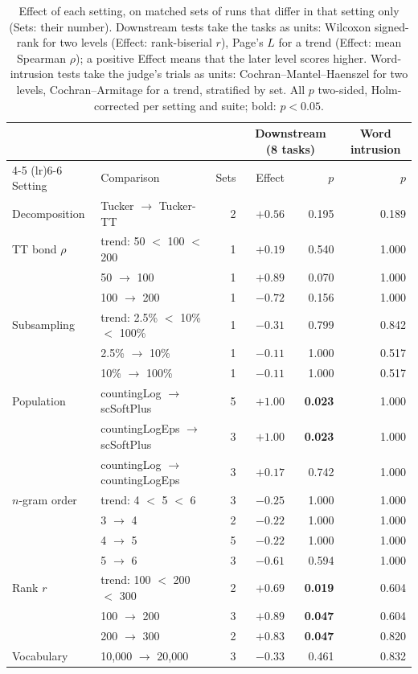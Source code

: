 \begin{table}[t]
  \centering
  \small
  \begin{tabular}{llrrrr}
    \toprule
     &  &  & \multicolumn{2}{c}{Downstream (8 tasks)} & \multicolumn{1}{c}{Word intrusion} \\
    \cmidrule(lr){4-5} \cmidrule(lr){6-6}
    Setting & Comparison & Sets & Effect & $p$ & $p$ \\
    \midrule
    Decomposition & Tucker $\rightarrow$ Tucker-TT & 2 & $+0.56$ & 0.195 & 0.189 \\
    \midrule
    TT bond $\rho$ & trend: 50 $<$ 100 $<$ 200 & 1 & $+0.19$ & 0.540 & 1.000 \\
     & 50 $\rightarrow$ 100 & 1 & $+0.89$ & 0.070 & 1.000 \\
     & 100 $\rightarrow$ 200 & 1 & $-0.72$ & 0.156 & 1.000 \\
    \midrule
    Subsampling & trend: 2.5\% $<$ 10\% $<$ 100\% & 1 & $-0.31$ & 0.799 & 0.842 \\
     & 2.5\% $\rightarrow$ 10\% & 1 & $-0.11$ & 1.000 & 0.517 \\
     & 10\% $\rightarrow$ 100\% & 1 & $-0.11$ & 1.000 & 0.517 \\
    \midrule
    Population & countingLog $\rightarrow$ scSoftPlus & 5 & $+1.00$ & \textbf{0.023} & 1.000 \\
     & countingLogEps $\rightarrow$ scSoftPlus & 3 & $+1.00$ & \textbf{0.023} & 1.000 \\
     & countingLog $\rightarrow$ countingLogEps & 3 & $+0.17$ & 0.742 & 1.000 \\
    \midrule
    $n$-gram order & trend: 4 $<$ 5 $<$ 6 & 3 & $-0.25$ & 1.000 & 1.000 \\
     & 3 $\rightarrow$ 4 & 2 & $-0.22$ & 1.000 & 1.000 \\
     & 4 $\rightarrow$ 5 & 5 & $-0.22$ & 1.000 & 1.000 \\
     & 5 $\rightarrow$ 6 & 3 & $-0.61$ & 0.594 & 1.000 \\
    \midrule
    Rank $r$ & trend: 100 $<$ 200 $<$ 300 & 2 & $+0.69$ & \textbf{0.019} & 0.604 \\
     & 100 $\rightarrow$ 200 & 3 & $+0.89$ & \textbf{0.047} & 0.604 \\
     & 200 $\rightarrow$ 300 & 2 & $+0.83$ & \textbf{0.047} & 0.820 \\
    \midrule
    Vocabulary & 10,000 $\rightarrow$ 20,000 & 3 & $-0.33$ & 0.461 & 0.832 \\
    \bottomrule
  \end{tabular}
  \caption{Effect of each setting, on matched sets of runs that differ in that setting only (Sets: their number). Downstream tests take the tasks as units: Wilcoxon signed-rank for two levels (Effect: rank-biserial $r$), Page's $L$ for a trend (Effect: mean Spearman $\rho$); a positive Effect means that the later level scores higher. Word-intrusion tests take the judge's trials as units: Cochran--Mantel--Haenszel for two levels, Cochran--Armitage for a trend, stratified by set. All $p$ two-sided, Holm-corrected per setting and suite; bold: $p < 0.05$.}
  \label{tab:param-tests}
\end{table}

